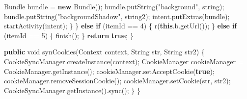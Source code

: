 \documentclass[
]{article}
\newenvironment{Shaded}{}{}
\newcommand{\BuiltInTok}[1]{\textcolor[rgb]{0.00,0.50,0.00}{#1}}
\newcommand{\ControlFlowTok}[1]{\textcolor[rgb]{0.00,0.44,0.13}{\textbf{#1}}}
\newcommand{\DataTypeTok}[1]{\textcolor[rgb]{0.56,0.13,0.00}{#1}}
\newcommand{\DecValTok}[1]{\textcolor[rgb]{0.25,0.63,0.44}{#1}}
\newcommand{\FunctionTok}[1]{\textcolor[rgb]{0.02,0.16,0.49}{#1}}
\newcommand{\KeywordTok}[1]{\textcolor[rgb]{0.00,0.44,0.13}{\textbf{#1}}}
\newcommand{\NormalTok}[1]{#1}
\newcommand{\OperatorTok}[1]{\textcolor[rgb]{0.40,0.40,0.40}{#1}}
\newcommand{\StringTok}[1]{\textcolor[rgb]{0.25,0.44,0.63}{#1}}
\begin{document}
\begin{Shaded}
\begin{Highlighting}[]
\NormalTok{                Bundle bundle }\OperatorTok{=} \KeywordTok{new} \FunctionTok{Bundle}\OperatorTok{();}
\NormalTok{                bundle}\OperatorTok{.}\FunctionTok{putString}\OperatorTok{(}\StringTok{"background"}\OperatorTok{,}\NormalTok{ string}\OperatorTok{);}
\NormalTok{                bundle}\OperatorTok{.}\FunctionTok{putString}\OperatorTok{(}\StringTok{"backgroundShadow"}\OperatorTok{,}\NormalTok{ string2}\OperatorTok{);}
\NormalTok{                intent}\OperatorTok{.}\FunctionTok{putExtras}\OperatorTok{(}\NormalTok{bundle}\OperatorTok{);}
                \FunctionTok{startActivity}\OperatorTok{(}\NormalTok{intent}\OperatorTok{);}
            \OperatorTok{\}}
        \OperatorTok{\}} \ControlFlowTok{else} \ControlFlowTok{if} \OperatorTok{(}\NormalTok{itemId }\OperatorTok{==} \DecValTok{4}\OperatorTok{)} \OperatorTok{\{}
            \FunctionTok{r}\OperatorTok{(}\KeywordTok{this}\OperatorTok{.}\FunctionTok{b}\OperatorTok{.}\FunctionTok{getUrl}\OperatorTok{());}
        \OperatorTok{\}} \ControlFlowTok{else} \ControlFlowTok{if} \OperatorTok{(}\NormalTok{itemId }\OperatorTok{==} \DecValTok{5}\OperatorTok{)} \OperatorTok{\{}
            \FunctionTok{finish}\OperatorTok{();}
        \OperatorTok{\}}
        \ControlFlowTok{return} \KeywordTok{true}\OperatorTok{;}
    \OperatorTok{\}}

    \KeywordTok{public} \DataTypeTok{void} \FunctionTok{synCookies}\OperatorTok{(}\BuiltInTok{Context}\NormalTok{ context}\OperatorTok{,} \BuiltInTok{String}\NormalTok{ str}\OperatorTok{,} \BuiltInTok{String}\NormalTok{ str2}\OperatorTok{)} \OperatorTok{\{}
\NormalTok{        CookieSyncManager}\OperatorTok{.}\FunctionTok{createInstance}\OperatorTok{(}\NormalTok{context}\OperatorTok{);}
        \BuiltInTok{CookieManager}\NormalTok{ cookieManager }\OperatorTok{=} \BuiltInTok{CookieManager}\OperatorTok{.}\FunctionTok{getInstance}\OperatorTok{();}
\NormalTok{        cookieManager}\OperatorTok{.}\FunctionTok{setAcceptCookie}\OperatorTok{(}\KeywordTok{true}\OperatorTok{);}
\NormalTok{        cookieManager}\OperatorTok{.}\FunctionTok{removeSessionCookie}\OperatorTok{();}
\NormalTok{        cookieManager}\OperatorTok{.}\FunctionTok{setCookie}\OperatorTok{(}\NormalTok{str}\OperatorTok{,}\NormalTok{ str2}\OperatorTok{);}
\NormalTok{        CookieSyncManager}\OperatorTok{.}\FunctionTok{getInstance}\OperatorTok{().}\FunctionTok{sync}\OperatorTok{();}
    \OperatorTok{\}}
\OperatorTok{\}}
\end{Highlighting}
\end{Shaded}
\end{document}
